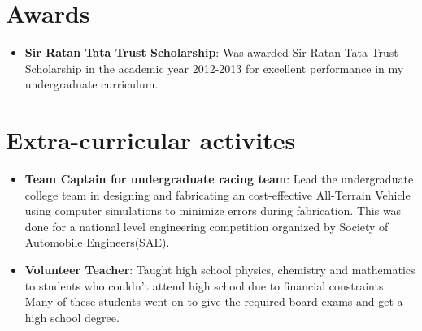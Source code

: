 \documentclass[letterpaper,11pt]{article}
\newcommand{\resumeItem}[2]{
  \item\small{
    \textbf{#1}{: #2 \vspace{-2pt}}
  }
}
\newcommand{\resumeSubItem}[2]{\resumeItem{#1}{#2}\vspace{-4pt}}
\newcommand{\resumeSubHeadingListStart}{\begin{itemize}[leftmargin=*]}
\newcommand{\resumeSubHeadingListEnd}{\end{itemize}}
\begin{document}
\section{Awards}
  \resumeSubHeadingListStart
    \resumeSubItem{Sir Ratan Tata Trust Scholarship}
      {Was awarded Sir Ratan Tata Trust Scholarship in the academic year 2012-2013 for excellent performance in my undergraduate curriculum.}
  \resumeSubHeadingListEnd

\section{Extra-curricular activites}
  \resumeSubHeadingListStart
    \resumeSubItem{Team Captain for undergraduate racing team}
      {Lead the undergraduate college team in designing and fabricating an cost-effective All-Terrain Vehicle using computer simulations to minimize errors during fabrication. This was done for a national level engineering competition organized by Society of Automobile Engineers(SAE).}
    \resumeSubItem{Volunteer Teacher}
      {Taught high school physics, chemistry and mathematics to students who couldn't attend high school due to financial constraints. Many of these students went on to give the required board exams and get a high school degree.}
  \resumeSubHeadingListEnd


%


\end{document}
